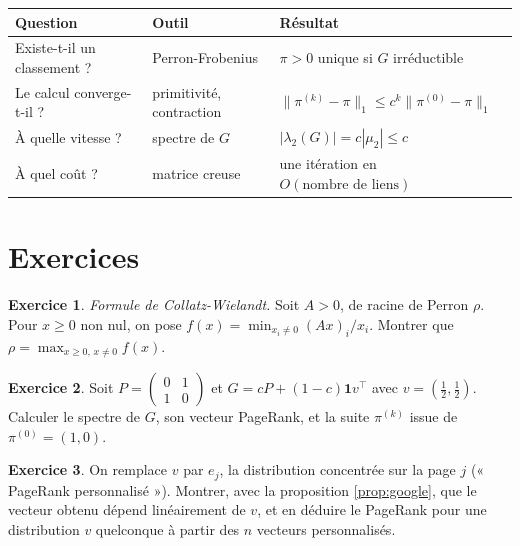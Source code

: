 \documentclass[11pt,a4paper]{article}
\theoremstyle{plain}
\theoremstyle{definition}
\newtheorem{exercice}{Exercice}
\theoremstyle{remark}
\newcommand{\un}{\mathbf{1}}
\begin{document}
\begin{center}
\renewcommand{\arraystretch}{1.25}
\begin{tabular}{@{}p{4.2cm}p{5.2cm}p{5.2cm}@{}}
\toprule
\textbf{Question} & \textbf{Outil} & \textbf{Résultat} \\
\midrule
Existe-t-il un classement ? & Perron-Frobenius & $\pi>0$ unique si $G$ irréductible \\
Le calcul converge-t-il ? & primitivité, contraction & $\|\pi^{(k)}-\pi\|_1\leq c^k\|\pi^{(0)}-\pi\|_1$ \\
À quelle vitesse ? & spectre de $G$ & $|\lambda_2(G)|=c|\mu_2|\leq c$ \\
À quel coût ? & matrice creuse & une itération en $O(\text{nombre de liens})$ \\
\bottomrule
\end{tabular}
\end{center}

\section{Exercices}

\begin{exercice}\label{exo:collatz}
\emph{Formule de Collatz-Wielandt.} Soit $A>0$, de racine de Perron $\rho$. Pour $x\geq0$ non nul, on pose $f(x)=\min_{x_i\neq0}(Ax)_i/x_i$. Montrer que $\rho=\max_{x\geq0,\,x\neq0}f(x)$.
\end{exercice}

\begin{exercice}\label{exo:periodique}
Soit $P=\begin{pmatrix}0&1\\1&0\end{pmatrix}$ et $G=cP+(1-c)\un v^\top$ avec $v=(\frac12,\frac12)$. Calculer le spectre de $G$, son vecteur PageRank, et la suite $\pi^{(k)}$ issue de $\pi^{(0)}=(1,0)$.
\end{exercice}

\begin{exercice}\label{exo:personnalise}
On remplace $v$ par $e_j$, la distribution concentrée sur la page $j$ (« PageRank personnalisé »). Montrer, avec la proposition \ref{prop:google}, que le vecteur obtenu dépend linéairement de $v$, et en déduire le PageRank pour une distribution $v$ quelconque à partir des $n$ vecteurs personnalisés.
\end{exercice}
\end{document}
